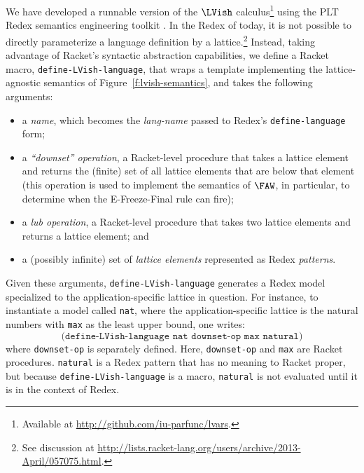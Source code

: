 We have developed a runnable version of the $\LVish$ calculus\footnote{Available at \url{http://github.com/iu-parfunc/lvars}.} using the
PLT Redex semantics engineering toolkit \cite{redex-book}.
In the Redex of today, it is not possible to directly parameterize a
language definition by a lattice.\footnote{See discussion at
  \url{http://lists.racket-lang.org/users/archive/2013-April/057075.html}.}
Instead, taking advantage of Racket's syntactic abstraction capabilities,
we define a Racket macro, \texttt{define-LVish-language},
that wraps a template implementing the lattice-agnostic semantics of 
Figure~\ref{f:lvish-semantics}, and takes the following arguments:
\begin{itemize}
\item a \emph{name}, which becomes the \emph{lang-name} passed to
  Redex's \texttt{define-language} form;
\item a \emph{``downset'' operation}, a Racket-level procedure that
  takes a lattice element and returns the (finite) set of all lattice
  elements that are below that element (this operation is used to
  implement the semantics of $\FAW$, in particular,
  to determine when the {\sc E-Freeze-Final} rule can fire);
\item a \emph{lub operation}, a Racket-level procedure that takes two
  lattice elements and returns a lattice element; and
\item a (possibly infinite) set of \emph{lattice elements} represented as
  Redex \emph{patterns}.
\end{itemize}
Given these arguments, \texttt{define-LVish-language} generates a
Redex model specialized to the application-specific lattice in question. For
instance, to instantiate a model called \texttt{nat}, where
the application-specific lattice is the natural numbers with \texttt{max} as
the least upper bound, one writes:
\[
\texttt{(define-LVish-language nat downset-op max natural)}
\]
where \texttt{downset-op} is separately defined.  
Here,
\texttt{downset-op} and \texttt{max} are Racket procedures.
\texttt{natural} is a Redex pattern that has no meaning to Racket proper, but
because \texttt{define-LVish-language} is a macro, \texttt{natural} is
not evaluated until it is in the context of Redex.
